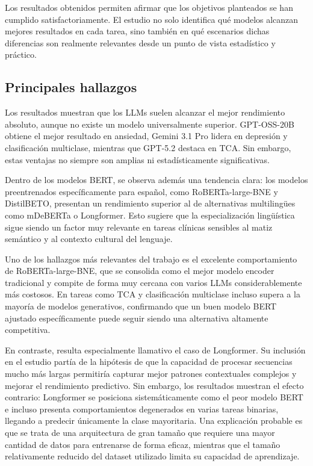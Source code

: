 Los resultados obtenidos permiten afirmar que los objetivos planteados se han cumplido satisfactoriamente. El estudio no solo identifica qué modelos alcanzan mejores resultados en cada tarea, sino también en qué escenarios dichas diferencias son realmente relevantes desde un punto de vista estadístico y práctico.

\subsection{Principales hallazgos}

Los resultados muestran que los LLMs suelen alcanzar el mejor rendimiento absoluto, aunque no existe un modelo universalmente superior. GPT-OSS-20B obtiene el mejor resultado en ansiedad, Gemini 3.1 Pro lidera en depresión y clasificación multiclase, mientras que GPT-5.2 destaca en TCA. Sin embargo, estas ventajas no siempre son amplias ni estadísticamente significativas.

Dentro de los modelos BERT, se observa además una tendencia clara: los modelos preentrenados específicamente para español, como RoBERTa-large-BNE y DistilBETO, presentan un rendimiento superior al de alternativas multilingües como mDeBERTa o Longformer. Esto sugiere que la especialización lingüística sigue siendo un factor muy relevante en tareas clínicas sensibles al matiz semántico y al contexto cultural del lenguaje.

Uno de los hallazgos más relevantes del trabajo es el excelente comportamiento de RoBERTa-large-BNE, que se consolida como el mejor modelo encoder tradicional y compite de forma muy cercana con varios LLMs considerablemente más costosos. En tareas como TCA y clasificación multiclase incluso supera a la mayoría de modelos generativos, confirmando que un buen modelo BERT ajustado específicamente puede seguir siendo una alternativa altamente competitiva.

En contraste, resulta especialmente llamativo el caso de Longformer. Su inclusión en el estudio partía de la hipótesis de que la capacidad de procesar secuencias mucho más largas permitiría capturar mejor patrones contextuales complejos y mejorar el rendimiento predictivo. Sin embargo, los resultados muestran el efecto contrario: Longformer se posiciona sistemáticamente como el peor modelo BERT e incluso presenta comportamientos degenerados en varias tareas binarias, llegando a predecir únicamente la clase mayoritaria. Una explicación probable es que se trata de una arquitectura de gran tamaño que requiere una mayor cantidad de datos para entrenarse de forma eficaz, mientras que el tamaño relativamente reducido del dataset utilizado limita su capacidad de aprendizaje.

